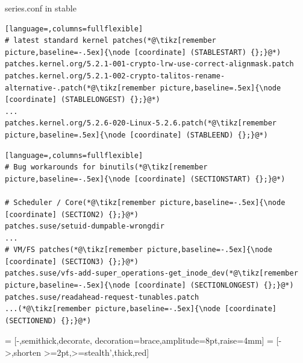 \begin{frame}[fragile]{series.conf in stable}

  \pause

  \begin{lstlisting}[language=,columns=fullflexible]
# latest standard kernel patches(*@\tikz[remember picture,baseline=-.5ex]{\node [coordinate] (STABLESTART) {};}@*)
patches.kernel.org/5.2.1-001-crypto-lrw-use-correct-alignmask.patch
patches.kernel.org/5.2.1-002-crypto-talitos-rename-alternative-.patch(*@\tikz[remember picture,baseline=.5ex]{\node [coordinate] (STABLELONGEST) {};}@*)
...
patches.kernel.org/5.2.6-020-Linux-5.2.6.patch(*@\tikz[remember picture,baseline=.5ex]{\node [coordinate] (STABLEEND) {};}@*)
  \end{lstlisting}

  \pause

  \begin{lstlisting}[language=,columns=fullflexible]
# Bug workarounds for binutils(*@\tikz[remember picture,baseline=-.5ex]{\node [coordinate] (SECTIONSTART) {};}@*)

# Scheduler / Core(*@\tikz[remember picture,baseline=-.5ex]{\node [coordinate] (SECTION2) {};}@*)
patches.suse/setuid-dumpable-wrongdir
...
# VM/FS patches(*@\tikz[remember picture,baseline=-.5ex]{\node [coordinate] (SECTION3) {};}@*)
patches.suse/vfs-add-super_operations-get_inode_dev(*@\tikz[remember picture,baseline=-.5ex]{\node [coordinate] (SECTIONLONGEST) {};}@*)
patches.suse/readahead-request-tunables.patch
...(*@\tikz[remember picture,baseline=-.5ex]{\node [coordinate] (SECTIONEND) {};}@*)
  \end{lstlisting}


   = [-,semithick,decorate,
          decoration={brace,amplitude=8pt,raise=4mm}]
   = [->,shorten >=2pt,>=stealth',thick,red]


  \begin{center}
  \end{center}

\end{frame}

